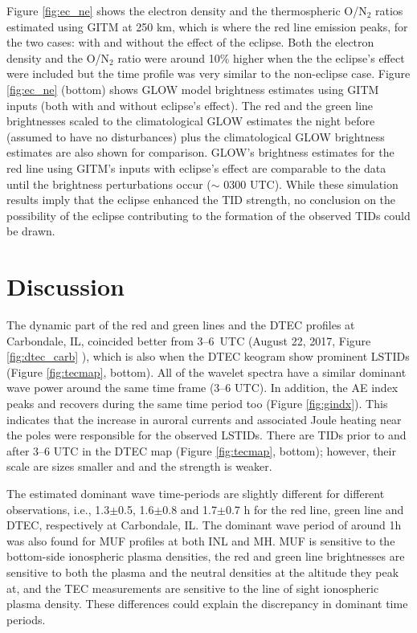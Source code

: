 \documentclass[crop=false,class=mitthesis,oneside,font=12pt]{standalone}
\begin{document}
Figure \ref{fig:ec_ne} shows the electron density and  the thermospheric O/N$_2$ ratios estimated using GITM at 250 km, which is where the red line emission peaks, for the two cases: with and without the effect of the eclipse. Both the electron density and the O/N$_2$ ratio were around 10\% higher when the the eclipse's effect were included but the time profile was very similar to the non-eclipse case. Figure \ref{fig:ec_ne} (bottom) shows GLOW model brightness estimates using GITM inputs (both with and without eclipse's effect). The red and the green line brightnesses scaled to the climatological GLOW estimates the night before (assumed to have no disturbances) plus the climatological GLOW brightness estimates are also shown for comparison. GLOW's brightness estimates for the red line using GITM's inputs  with eclipse's effect are comparable to the data until the brightness perturbations occur ($\sim$ 0300 UTC). While these simulation results imply that the eclipse enhanced the TID strength, no conclusion on the possibility of the eclipse contributing to the formation of the observed TIDs could be drawn.  

\section{Discussion}
The dynamic part of the red and green lines and the DTEC profiles at Carbondale, IL, coincided better from 3--6~UTC (August 22, 2017, Figure \ref{fig:dtec_carb} ), which is also when the DTEC keogram show prominent LSTIDs (Figure \ref{fig:tecmap}, bottom). All of the wavelet spectra have a similar dominant wave power around the same time frame (3--6 UTC). In addition, the AE index peaks and recovers during the same time period too (Figure \ref{fig:gindx}). This indicates that the increase in auroral currents and associated Joule heating near the poles were responsible for the observed LSTIDs. There are TIDs prior to and after 3--6 UTC in the DTEC map (Figure \ref{fig:tecmap}, bottom); however, their scale are sizes smaller and and the strength is weaker. 

The estimated dominant wave time-periods are slightly different for different observations, i.e., 1.3$\pm$0.5, 1.6$\pm$0.8 and 1.7$\pm$0.7 h for the red line, green line and DTEC, respectively at Carbondale, IL. The dominant wave period of around 1h was also found for MUF profiles at both INL and MH. MUF is sensitive to the bottom-side ionospheric plasma densities, the red and green line brightnesses are sensitive to both the plasma and the neutral densities at the altitude they peak at, and the TEC measurements are sensitive to the line of sight ionospheric plasma density. These differences could explain the discrepancy in dominant time periods. 
\end{document}
